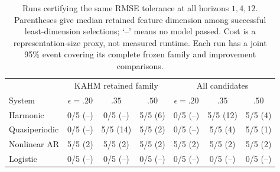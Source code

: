 \begin{table}[t]
\centering\small
\begin{tabular}{lcccccc}
\toprule
& \multicolumn{3}{c}{KAHM retained family} & \multicolumn{3}{c}{All candidates}\\
System & $\epsilon=.20$ & $.35$ & $.50$ & $\epsilon=.20$ & $.35$ & $.50$\\
\midrule
Harmonic & 0/5 (--) & 0/5 (--) & 5/5 (6) & 0/5 (--) & 5/5 (12) & 5/5 (4)\\
Quasiperiodic & 0/5 (--) & 5/5 (14) & 5/5 (2) & 0/5 (--) & 5/5 (4) & 5/5 (1)\\
Nonlinear AR & 5/5 (2) & 5/5 (2) & 5/5 (2) & 5/5 (2) & 5/5 (2) & 5/5 (2)\\
Logistic & 0/5 (--) & 0/5 (--) & 0/5 (--) & 0/5 (--) & 0/5 (--) & 0/5 (--)\\
\bottomrule
\end{tabular}
\caption{Runs certifying the same RMSE tolerance at all horizons $1,4,12$. Parentheses give median retained feature dimension among successful least-dimension selections; `--' means no model passed. Cost is a representation-size proxy, not measured runtime. Each run has a joint 95\% event covering its complete frozen family and improvement comparisons.}
\label{tab:selection}
\end{table}
